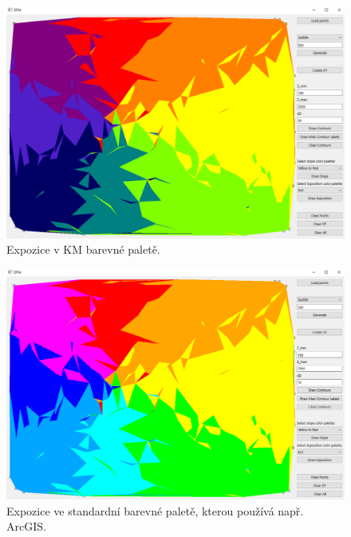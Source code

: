 \documentclass[a4paper, 12pt, oneside, titlepage]{article} %
\begin{document}
\begin{figure}[!htb]
	\centering
	\includegraphics[scale=0.45]{obrazky/exp_km.png} 
	\caption{Expozice v KM barevné paletě.
	}
	\label{fig:exp_km}
\end{figure} 
\FloatBarrier

\begin{figure}[!htb]
	\centering
	\includegraphics[scale=0.45]{obrazky/exp_arcgis.png} 
	\caption{Expozice ve standardní barevné paletě, kterou používá např. ArcGIS.
	}
	\label{fig:exp_arcgis}
\end{figure} 
\FloatBarrier
\end{document}
